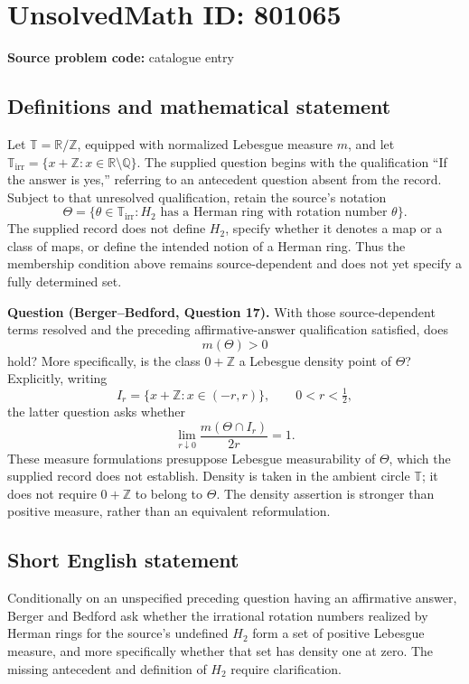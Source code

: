 \documentclass[11pt]{article}
\begin{document}
\section*{UnsolvedMath ID: 801065}
\textbf{Source problem code:} catalogue entry
\subsection{Definitions and mathematical statement}
Let \(\mathbb{T}=\mathbb{R}/\mathbb{Z}\), equipped with normalized Lebesgue measure \(m\), and let \(\mathbb{T}_{\mathrm{irr}}=\{x+\mathbb{Z}:x\in\mathbb{R}\setminus\mathbb{Q}\}\). The supplied question begins with the qualification ``If the answer is yes,'' referring to an antecedent question absent from the record. Subject to that unresolved qualification, retain the source's notation
\[
\Theta=\{\theta\in\mathbb{T}_{\mathrm{irr}}:H_2\text{ has a Herman ring with rotation number }\theta\}.
\]
The supplied record does not define \(H_2\), specify whether it denotes a map or a class of maps, or define the intended notion of a Herman ring. Thus the membership condition above remains source-dependent and does not yet specify a fully determined set.

\textbf{Question (Berger--Bedford, Question 17).} With those source-dependent terms resolved and the preceding affirmative-answer qualification satisfied, does
\[
m(\Theta)>0
\]
hold? More specifically, is the class \(0+\mathbb{Z}\) a Lebesgue density point of \(\Theta\)? Explicitly, writing
\[
I_r=\{x+\mathbb{Z}:x\in(-r,r)\},\qquad 0<r<\tfrac12,
\]
the latter question asks whether
\[
\lim_{r\downarrow0}\frac{m(\Theta\cap I_r)}{2r}=1.
\]
These measure formulations presuppose Lebesgue measurability of \(\Theta\), which the supplied record does not establish. Density is taken in the ambient circle \(\mathbb{T}\); it does not require \(0+\mathbb{Z}\) to belong to \(\Theta\). The density assertion is stronger than positive measure, rather than an equivalent reformulation.
\subsection{Short English statement}
Conditionally on an unspecified preceding question having an affirmative answer, Berger and Bedford ask whether the irrational rotation numbers realized by Herman rings for the source's undefined \(H_2\) form a set of positive Lebesgue measure, and more specifically whether that set has density one at zero. The missing antecedent and definition of \(H_2\) require clarification.
\end{document}
